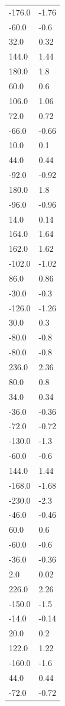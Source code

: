 \begin{longtable}{ll}
-176.0 & -1.76 \\
-60.0 & -0.6 \\
32.0 & 0.32 \\
144.0 & 1.44 \\
180.0 & 1.8 \\
60.0 & 0.6 \\
106.0 & 1.06 \\
72.0 & 0.72 \\
-66.0 & -0.66 \\
10.0 & 0.1 \\
44.0 & 0.44 \\
-92.0 & -0.92 \\
180.0 & 1.8 \\
-96.0 & -0.96 \\
14.0 & 0.14 \\
164.0 & 1.64 \\
162.0 & 1.62 \\
-102.0 & -1.02 \\
86.0 & 0.86 \\
-30.0 & -0.3 \\
-126.0 & -1.26 \\
30.0 & 0.3 \\
-80.0 & -0.8 \\
-80.0 & -0.8 \\
236.0 & 2.36 \\
80.0 & 0.8 \\
34.0 & 0.34 \\
-36.0 & -0.36 \\
-72.0 & -0.72 \\
-130.0 & -1.3 \\
-60.0 & -0.6 \\
144.0 & 1.44 \\
-168.0 & -1.68 \\
-230.0 & -2.3 \\
-46.0 & -0.46 \\
60.0 & 0.6 \\
-60.0 & -0.6 \\
-36.0 & -0.36 \\
2.0 & 0.02 \\
226.0 & 2.26 \\
-150.0 & -1.5 \\
-14.0 & -0.14 \\
20.0 & 0.2 \\
122.0 & 1.22 \\
-160.0 & -1.6 \\
44.0 & 0.44 \\
-72.0 & -0.72 \\

\end{longtable}
